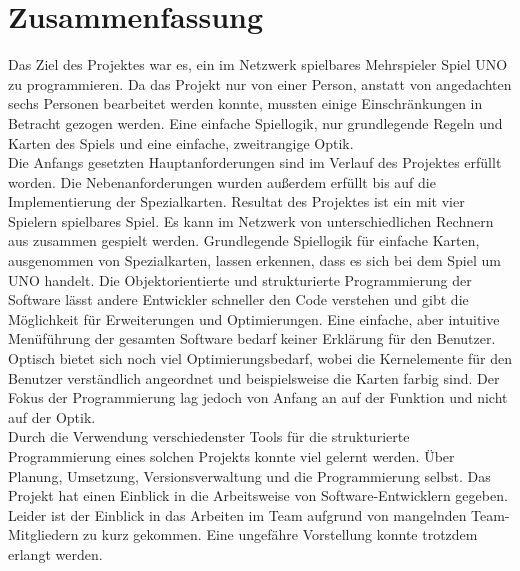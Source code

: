 
\chapter{Zusammenfassung}
Das Ziel des Projektes war es, ein im Netzwerk spielbares Mehrspieler Spiel UNO zu programmieren. Da das Projekt nur von einer Person, anstatt von angedachten sechs Personen bearbeitet werden konnte, mussten einige Einschränkungen in Betracht gezogen werden. Eine einfache Spiellogik, nur grundlegende Regeln und Karten des Spiels und eine einfache, zweitrangige Optik.\\
Die Anfangs gesetzten Hauptanforderungen sind im Verlauf des Projektes erfüllt worden. Die Nebenanforderungen wurden außerdem erfüllt bis auf die Implementierung der Spezialkarten. Resultat des Projektes ist ein mit vier Spielern spielbares Spiel. Es kann im Netzwerk von unterschiedlichen Rechnern aus zusammen gespielt werden. Grundlegende Spiellogik für einfache Karten, ausgenommen von Spezialkarten, lassen erkennen, dass es sich bei dem Spiel um UNO handelt. Die Objektorientierte und strukturierte Programmierung der Software lässt andere Entwickler schneller den Code verstehen und gibt die Möglichkeit für Erweiterungen und Optimierungen. Eine einfache, aber intuitive Menüführung der gesamten Software bedarf keiner Erklärung für den Benutzer. Optisch bietet sich noch viel Optimierungsbedarf, wobei die Kernelemente für den Benutzer verständlich angeordnet und beispielsweise die Karten farbig sind. Der Fokus der Programmierung lag jedoch von Anfang an auf der Funktion und nicht auf der Optik.\\
Durch die Verwendung verschiedenster Tools für die strukturierte Programmierung eines solchen Projekts konnte viel gelernt werden. Über Planung, Umsetzung, Versionsverwaltung und die Programmierung selbst. Das Projekt hat einen Einblick in die Arbeitsweise von Software-Entwicklern gegeben. Leider ist der Einblick in das Arbeiten im Team aufgrund von mangelnden Team-Mitgliedern zu kurz gekommen. Eine ungefähre Vorstellung konnte trotzdem erlangt werden.